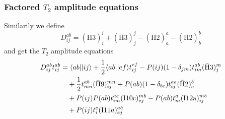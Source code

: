 \begin{frame}
    \frametitle{Factored $T_2$ amplitude equations}

Similarily we define
\begin{equation*}
    D_{ij}^{ab} = (\mathrm{\bar{H}3})_i^i + (\mathrm{\bar{H}3})_j^j
        - (\mathrm{\bar{H}2})_a^a - (\mathrm{\bar{H}2})_b^b 
\end{equation*}
and get the $T_2$ amplitude equations
\begin{equation*}
\begin{split}
    D_{ij}^{ab} t_{ij}^{ab} &= 
        \langle ab| |ij\rangle 
        + \frac{1}{2} \langle ab||ef\rangle t_{ij}^{ef}
        - P(ij)(1-\delta_{jm}) t_{im}^{ab} (\mathrm{\bar{H}3})_j^m \\
        & \quad + \frac{1}{2} t_{mn}^{ab} (\mathrm{\bar{H}9})_{ij}^{mn}
        + P(ab) (1-\delta_{be}) t_{ij}^{ae} (\mathrm{\bar{H}2})_e^b \\
        & \quad + P(ij) P(ab) t_{im}^{ae} (\mathrm{I10c})_{ej}^{mb}
        - P(ab) t_m^a (\mathrm{I12a})_{ij}^{mb} \\
        & \quad + P(ij)t_i^e (\mathrm{I}11a)_{ej}^{ab}
\end{split}
\end{equation*}

\end{frame}

